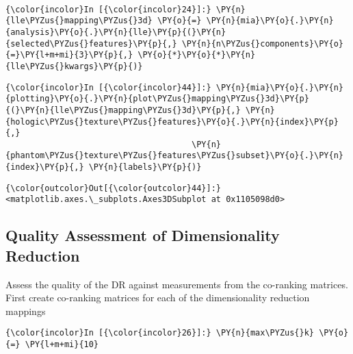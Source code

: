     \begin{center}
    \end{center}
    { \hspace*{\fill} \\}

    \begin{Verbatim}[commandchars=\\\{\}]
{\color{incolor}In [{\color{incolor}24}]:} \PY{n}{lle\PYZus{}mapping\PYZus{}3d} \PY{o}{=} \PY{n}{mia}\PY{o}{.}\PY{n}{analysis}\PY{o}{.}\PY{n}{lle}\PY{p}{(}\PY{n}{selected\PYZus{}features}\PY{p}{,} \PY{n}{n\PYZus{}components}\PY{o}{=}\PY{l+m+mi}{3}\PY{p}{,} \PY{o}{*}\PY{o}{*}\PY{n}{lle\PYZus{}kwargs}\PY{p}{)}
\end{Verbatim}

    \begin{Verbatim}[commandchars=\\\{\}]
{\color{incolor}In [{\color{incolor}44}]:} \PY{n}{mia}\PY{o}{.}\PY{n}{plotting}\PY{o}{.}\PY{n}{plot\PYZus{}mapping\PYZus{}3d}\PY{p}{(}\PY{n}{lle\PYZus{}mapping\PYZus{}3d}\PY{p}{,} \PY{n}{hologic\PYZus{}texture\PYZus{}features}\PY{o}{.}\PY{n}{index}\PY{p}{,}
                                      \PY{n}{phantom\PYZus{}texture\PYZus{}features\PYZus{}subset}\PY{o}{.}\PY{n}{index}\PY{p}{,} \PY{n}{labels}\PY{p}{)}
\end{Verbatim}

            \begin{Verbatim}[commandchars=\\\{\}]
{\color{outcolor}Out[{\color{outcolor}44}]:} <matplotlib.axes.\_subplots.Axes3DSubplot at 0x1105098d0>
\end{Verbatim}

    \subsection{Quality Assessment of Dimensionality
Reduction}\label{quality-assessment-of-dimensionality-reduction}

    Assess the quality of the DR against measurements from the co-ranking
matrices. First create co-ranking matrices for each of the
dimensionality reduction mappings

    \begin{Verbatim}[commandchars=\\\{\}]
{\color{incolor}In [{\color{incolor}26}]:} \PY{n}{max\PYZus{}k} \PY{o}{=} \PY{l+m+mi}{10}
\end{Verbatim}

